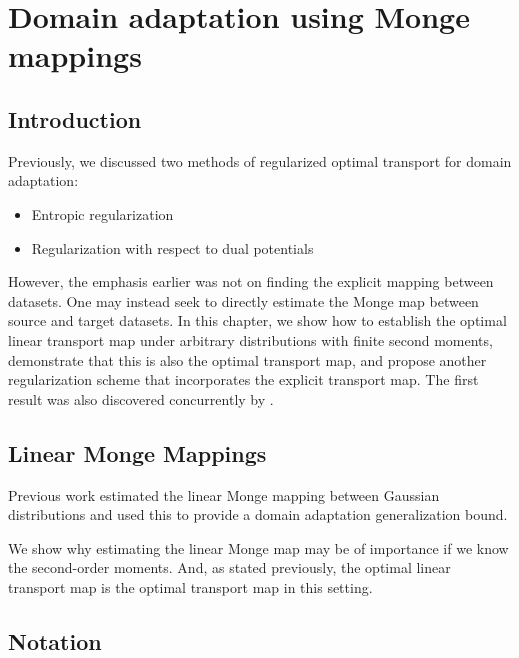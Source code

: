 \chapter{Domain adaptation using Monge mappings}

\section*{Introduction}
Previously, we discussed two methods of regularized optimal transport for domain adaptation:
\begin{itemize}
	\item Entropic regularization
	\item Regularization with respect to dual potentials
\end{itemize}

However, the emphasis earlier was not on finding the explicit mapping between datasets. One may instead seek to directly estimate the Monge map between source and target datasets. In this chapter, we show how to establish the optimal linear transport map under arbitrary distributions with finite second moments, demonstrate that this is also the optimal transport map, and propose another regularization scheme that incorporates the explicit transport map. The first result was also discovered concurrently by \cite{Flamary2019}.

\section*{Linear Monge Mappings}
Previous work \cite{Flamary2019} estimated the linear Monge mapping between Gaussian distributions and used this to provide a domain adaptation generalization bound.

We show why estimating the linear Monge map may be of importance if we know the second-order moments. And, as stated previously, the optimal linear transport map is the optimal transport map in this setting.



\section*{Notation}

